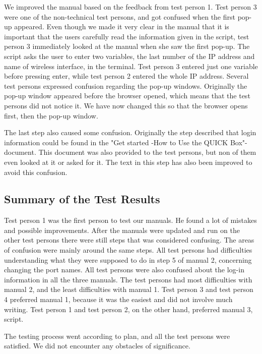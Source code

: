 We improved the manual based on the feedback from test person 1. Test person 3 were one of the non-technical test persons, and got confused when the first pop-up appeared. Even though we made it very clear in the manual that it is important that the users carefully read the information given in the script, test person 3 immediately looked at the manual when she saw the first pop-up. The script asks the user to enter two variables, the last number of the IP address and name of wireless interface, in the terminal. Test person 3 entered just one variable before pressing enter, while test person 2 entered the whole IP address. 
Several test persons expressed confusion regarding the pop-up windows. Originally the pop-up window appeared before the browser opened, which means that the test persons did not notice it. We have now changed this so that the browser opens first, then the pop-up window. 

The last step also caused some confusion. Originally the step described that login information could be found in the "Get started -How to Use the QUICK Box"-document. This document was also provided to the test persons, but non of them even looked at it or asked for it. The text in this step has also been improved to avoid this confusion.

\subsection{Summary of the Test Results}
Test person 1 was the first person to test our manuals. He found a lot of mistakes and possible improvements. After the manuals were updated and run on the other test persons there were still steps that was considered confusing. The areas of confusion were mainly around the same steps. All test persons had difficulties understanding what they were supposed to do in step 5 of manual 2, concerning changing the port names. All test persons were also confused about the log-in information in all the three manuals. The test persons had most difficulties with manual 2, and the least difficulties with manual 1. Test person 3 and test person 4 preferred manual 1, because it was the easiest and did not involve much writing. Test person 1 and test person 2, on the other hand, preferred manual 3, script. 

The testing process went according to plan, and all the test persons were satisfied. We did not encounter any obstacles of significance. 